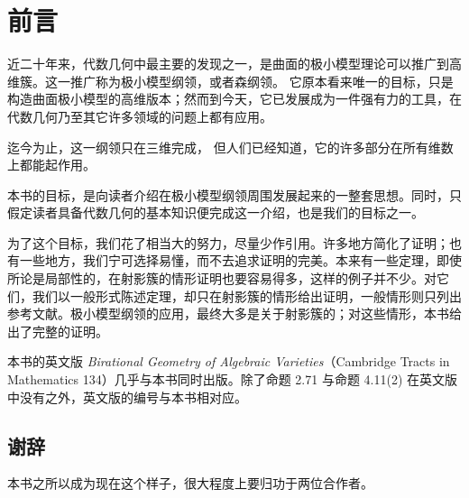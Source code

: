 \chapter*{前言}

近二十年来，代数几何中最主要的发现之一，是曲面的极小模型理论可以推广到高维簇。这一推广称为极小模型纲领，或者森纲领。%
它原本看来唯一的目标，只是构造曲面极小模型的高维版本；然而到今天，它已发展成为一件强有力的工具，在代数几何乃至其它许多领域的问题上都有应用。

迄今为止，这一纲领只在三维完成，%
但人们已经知道，它的许多部分在所有维数上都能起作用。

本书的目标，是向读者介绍在极小模型纲领周围发展起来的一整套思想。同时，只假定读者具备代数几何的基本知识便完成这一介绍，也是我们的目标之一。

为了这个目标，我们花了相当大的努力，尽量少作引用。许多地方简化了证明；也有一些地方，我们宁可选择易懂，而不去追求证明的完美。本来有一些定理，即使所论是局部性的，在射影簇的情形证明也要容易得多，这样的例子并不少。对它们，我们以一般形式陈述定理，却只在射影簇的情形给出证明，一般情形则只列出参考文献。极小模型纲领的应用，最终大多是关于射影簇的；对这些情形，本书给出了完整的证明。

本书的英文版 \emph{Birational Geometry of Algebraic Varieties}（Cambridge Tracts in Mathematics 134）几乎与本书同时出版。除了命题 2.71 与命题 4.11(2) 在英文版中没有之外，英文版的编号与本书相对应。%

\section*{谢辞}

本书之所以成为现在这个样子，很大程度上要归功于两位合作者。

